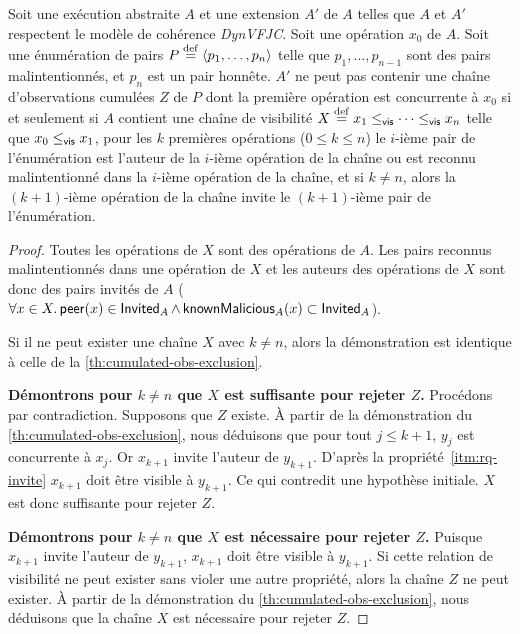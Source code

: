 \begin{proposition}\label{th:cumulated-obs-exclusion-dyn}
Soit une exécution abstraite $A$ et une extension $A'$ de $A$ telles que $A$ et $A'$ respectent le modèle de cohérence \emph{DynVFJC}.
Soit une opération $x_0$ de $A$.
Soit une énumération de pairs $P \defeq \tuple*{p_1, \dotsc ,p_n}$ telle que $p_1, \dotsc, p_{n-1}$ sont des pairs malintentionnés, et $p_n$ est un pair honnête.
$A'$ ne peut pas contenir une chaîne d'observations cumulées $Z$ de $P$ dont la première opération est concurrente à $x_0$ si et seulement si $A$ contient une chaîne de visibilité $X \defeq x_1 \viseq \dotsb \viseq x_n$ telle que $x_0 \viseq x_1$, pour les $k$ premières opérations ($0 \leq k \leq n$) le $i$-ième pair de l'énumération est l'auteur de la $i$-ième opération de la chaîne ou est reconnu malintentionné dans la $i$-ième opération de la chaîne, et si $k \neq n$, alors la $(k+1)$-ième opération de la chaîne invite le $(k+1)$-ième pair de l'énumération.
\end{proposition}

\begin{proof}
Toutes les opérations de $X$ sont des opérations de $A$.
Les pairs reconnus malintentionnés dans une opération de $X$ et les auteurs des opérations de $X$ sont donc des pairs invités de $A$ ($\forall x \in X \qsep \trm{peer}(x) \in \trm{Invited}_A \land \trm{knownMalicious}_A(x) \subset \trm{Invited}_A$).

Si il ne peut exister une chaîne $X$ avec $k \neq n$, alors la démonstration est identique à celle de la \autoref{th:cumulated-obs-exclusion}.

\textbf{Démontrons pour $k \neq n$ que $X$ est suffisante pour rejeter $Z$.}
Procédons par contradiction.
Supposons que $Z$ existe.
À partir de la démonstration du \autoref{th:cumulated-obs-exclusion}, nous déduisons que pour tout $j \leq k + 1$, $y_j$ est concurrente à $x_j$.
Or $x_{k+1}$ invite l'auteur de $y_{k+1}$.
D'après la propriété~\ref{itm:rq-invite} $x_{k+1}$ doit être visible à $y_{k+1}$.
Ce qui contredit une hypothèse initiale.
$X$ est donc suffisante pour rejeter $Z$.

\textbf{Démontrons pour $k \neq n$ que $X$ est nécessaire pour rejeter $Z$.}
Puisque $x_{k+1}$ invite l'auteur de $y_{k+1}$, $x_{k+1}$ doit être visible à $y_{k+1}$.
Si cette relation de visibilité ne peut exister sans violer une autre propriété, alors la chaîne $Z$ ne peut exister.
À partir de la démonstration du \autoref{th:cumulated-obs-exclusion}, nous déduisons que la chaîne $X$ est nécessaire pour rejeter $Z$.
\end{proof}

